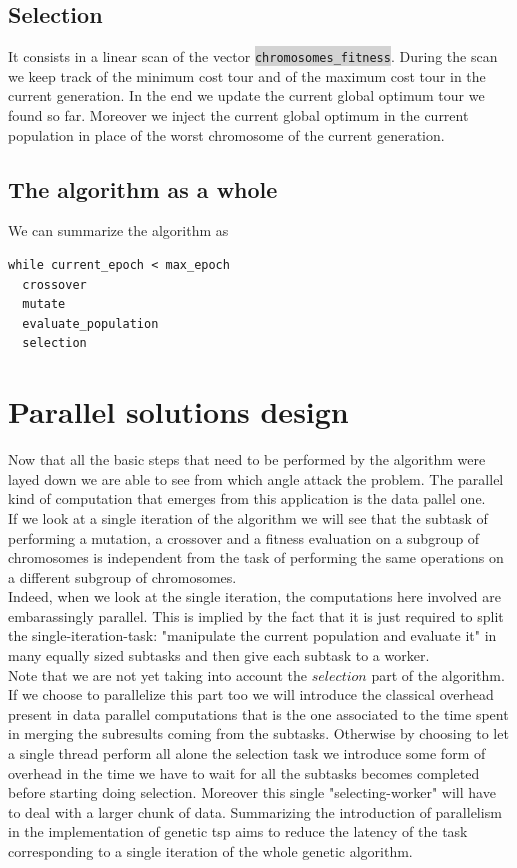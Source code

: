 \documentclass[11pt]{article}
\newcommand{\inlinecode}[2]{\colorbox{lightgray}{\lstinline[language=#1]$#2$}}
\begin{document}
\subsection{Selection}
It consists in a linear scan of the vector \inlinecode{C++}{chromosomes_fitness}. During the scan we keep track of the minimum cost tour and of the maximum cost tour in the current generation. In the end we update the current global optimum tour we found so far. Moreover we inject the current global optimum in the current population in place of the worst chromosome of the current generation.

\subsection{The algorithm as a whole}
We can summarize the algorithm as
\begin{lstlisting}
while current_epoch < max_epoch
  crossover
  mutate
  evaluate_population
  selection
\end{lstlisting}

\section{Parallel solutions design}
Now that all the basic steps that need to be performed by the algorithm were layed down we are able to see from which angle attack the problem. The parallel kind of computation that emerges from this application is the data pallel one.\\
If we look at a single iteration of the algorithm we will see that the subtask of performing a mutation, a crossover and a fitness evaluation on a subgroup of chromosomes is independent from the task of performing the same operations on a different subgroup of chromosomes.\\
Indeed, when we look at the single iteration, the computations here involved are embarassingly parallel. This is implied by the fact that it is just required to split the single-iteration-task: "manipulate the current population and evaluate it" in many equally sized subtasks and then give each subtask to a worker.\\
Note that we are not yet taking into account the $ selection $ part of the algorithm.
If we choose to parallelize this part too we will introduce the classical overhead present in data parallel computations that is the one associated to the time spent in merging the subresults coming from the subtasks. Otherwise by choosing to let a single thread perform all alone the selection task we introduce some form of overhead in the time we have to wait for all the subtasks becomes completed before starting doing selection. Moreover this single "selecting-worker" will have to deal with a larger chunk of data.
Summarizing the introduction of parallelism in the implementation of genetic tsp aims to reduce the latency of the task corresponding to a single iteration of the whole genetic algorithm.
\end{document}

